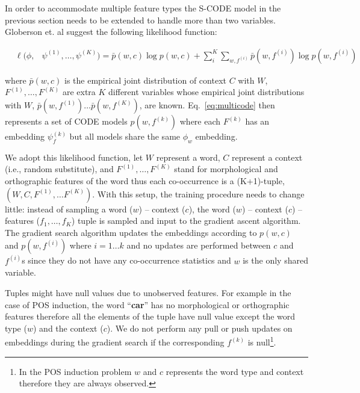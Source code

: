 
In order to accommodate multiple feature types the S-CODE model in the
previous section needs to be extended to handle more than two
variables.  Globerson et. al 
suggest the following likelihood function:

\begin{eqnarray}
&\ell(\phi,& \psi^{(1)}, \ldots, \psi^{(K)}) = \label{eq:multicode}
  \bar{p}(w,c) \log p(w,c) + \sum_i^K \sum_{w,f^{(i)}} \bar{p}(w,f^{(i)}) \log p(w,f^{(i)})
\end{eqnarray}

\noindent where $\bar{p}(w,c)$ is the empirical joint distribution of
context $C$ with $W$, $F^{(1)}, \ldots, F^{(K)}$ are extra $K$
different variables whose empirical joint distributions with $W$,
$\bar{p}(w,f^{(1)})\ldots\bar{p}(w,f^{(K)})$, are known.
Eq.~\ref{eq:multicode} then represents a set of CODE models
$p(w,f^{(k)})$ where each $F^{(k)}$ has an embedding $\psi_f^{(k)}$
but all models share the same $\phi_w$ embedding.

We adopt this likelihood function, let $W$ represent a word, $C$
represent a context (i.e., random substitute), and $F^{(1)}, \ldots,
F^{(K)}$ stand for morphological and orthographic features of the word
thus each co-occurrence is a (K+1)-tuple, $(W, C, F^{(1)}, \hdots
F^{(K)})$.  With this setup, the training procedure needs to change
little: instead of sampling a word ($w$) -- context ($c$), the word
($w$) -- context ($c$) -- features ($f_1,\hdots,f_K$) tuple is sampled
and input to the gradient ascent algorithm.  The gradient search
algorithm updates the embeddings according to $p(w,c)$ and
$p(w,f^{(i)})$ where $i=1\hdots k$ and no updates are performed
between $c$ and $f^{(i)}$s since they do not have any co-occurrence
statistics and $w$ is the only shared variable.

Tuples might have null values due to unobserved features.  For example
in the case of POS induction, the word ``\textbf{car}'' has no
morphological or orthographic features therefore all the elements of
the tuple have null value except the word type ($w$) and the context
($c$).  We do not perform any pull or push updates on embeddings
during the gradient search if the corresponding $f^{(k)}$ is
null\footnote{In the POS induction problem $w$ and $c$ represents the
  word type and context therefore they are always observed.}.

